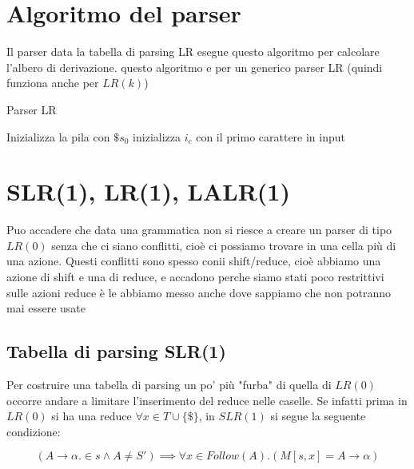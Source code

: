 \section{Algoritmo del parser}
Il parser data la tabella di parsing LR esegue questo algoritmo per calcolare l’albero di derivazione. questo
algoritmo e per un generico parser LR (quindi funziona anche per $LR(k)$)
\begin{algorithm}
        \caption{Parser LR}
        Inizializza la pila con $\$ s_0$\;
        inizializza $i_c$ con il primo carattere in input\;
\end{algorithm}

\section{SLR(1), LR(1), LALR(1)}

Puo accadere che data una grammatica non si riesce a creare un parser di tipo $LR(0)$ senza che ci siano conflitti, cioè ci possiamo trovare in una cella più di una azione. Questi conflitti sono spesso conii shift/reduce, cioè abbiamo una azione di shift e una di reduce, e accadono perche siamo stati poco restrittivi sulle azioni reduce è le abbiamo messo anche dove sappiamo che non potranno mai essere usate

\subsection{Tabella di parsing SLR(1)}
Per costruire una tabella di parsing un po' più "furba" di quella di $LR(0)$ occorre andare a limitare l'inserimento del reduce nelle caselle. Se infatti prima in $LR(0)$ si ha una reduce $\forall x\in T\cup\{\$\}$, in $SLR(1)$ si segue la seguente condizione:

\[
    (A\to \alpha.\in s\land A\neq S')\implies \forall x\in Follow(A).(M[s,x] = A\to\alpha)
\]

